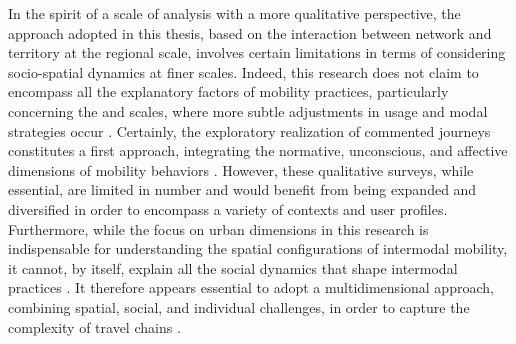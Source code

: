 \begin{refsegment}
In the spirit of a  scale of analysis with a more qualitative perspective, the  approach adopted in this thesis, based on the interaction between network and territory at the regional scale, involves certain limitations in terms of considering socio-spatial dynamics at finer scales. Indeed, this research does not claim to encompass all the explanatory factors of mobility practices, particularly concerning the  and  scales, where more subtle adjustments in usage and modal strategies occur \textcolor{blue}{\autocite[7]{desjeux_sciences_2004}}. Certainly, the exploratory realization of commented journeys constitutes a first  approach, integrating the normative, unconscious, and affective dimensions of mobility behaviors \textcolor{blue}{\autocite[7]{desjeux_sciences_2004}}. However, these qualitative surveys, while essential, are limited in number and would benefit from being expanded and diversified in order to encompass a variety of contexts and user profiles. Furthermore, while the focus on urban dimensions in this research is indispensable for understanding the spatial configurations of intermodal mobility, it cannot, by itself, explain all the social dynamics that shape intermodal practices \textcolor{blue}{\autocite[4]{gaudron-arlon_gender_2022}}. It therefore appears essential to adopt a multidimensional approach, combining spatial, social, and individual challenges, in order to capture the complexity of travel chains \textcolor{blue}{\autocite[7]{heesch_gender_2012}}.%


\end{refsegment}
